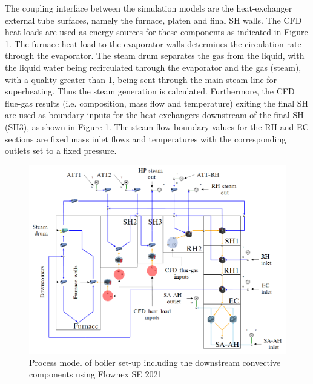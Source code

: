 \documentclass[review]{elsarticle}
\begin{document}
The coupling interface between the simulation models are the heat-exchanger external tube surfaces, namely the furnace, platen and final SH walls. The CFD heat loads are used as energy sources for these components as indicated in Figure \ref{fig_flownex}. The furnace heat load to the evaporator walls determines the circulation rate through the evaporator. The steam drum separates the gas from the liquid, with the liquid water being recirculated through the evaporator and the gas (steam), with a quality greater than 1, being sent through the main steam line for superheating. Thus the steam generation is calculated. Furthermore, the CFD flue-gas results (i.e. composition, mass flow and temperature) exiting the final SH are used as boundary inputs for the heat-exchangers downstream of the final SH (SH3), as shown in Figure \ref{fig_flownex}. The steam flow boundary values for the RH and EC sections are fixed mass inlet flows and temperatures with the corresponding outlets set to a fixed pressure.

\begin{figure}[h!]
\centering
\includegraphics[scale=0.5]{FLOWNEX_SETUP}
\caption{Process model of boiler set-up including the downstream convective components using Flownex SE 2021}
\label{fig_flownex}
\end{figure}
\end{document}

